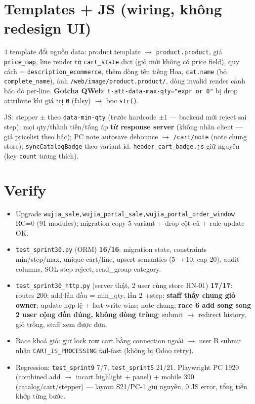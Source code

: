 \section{Templates + JS (wiring, không redesign UI)}

4 template đổi nguồn data: product.template $\rightarrow$ \texttt{product.product}, giá
\texttt{price\_map}, line render từ \texttt{cart\_state} dict (giỏ mới không có price field),
quy cách = \texttt{description\_ecommerce}, thêm dòng tên tiếng Hoa, \texttt{cat.name} (bỏ
\texttt{complete\_name}), ảnh \texttt{/web/image/product.product/}, dòng invalid render
cảnh báo đỏ per-line. \textbf{Gotcha QWeb}: \texttt{t-att-data-max-qty="expr or 0"} bị drop
attribute khi giá trị \texttt{0} (falsy) $\rightarrow$ bọc \texttt{str()}.

JS: stepper $\pm$ theo \texttt{data-min-qty} (trước hardcode $\pm1$ --- backend mới reject sai
step); mọi qty/thành tiền/tổng áp \textbf{từ response server} (không nhân client --- giá
pricelist theo bậc); PC note autosave debounce $\rightarrow$ \texttt{/cart/note} (note chung
store); \texttt{syncCatalogBadge} theo variant id. \texttt{header\_cart\_badge.js} giữ nguyên
(key \texttt{count} tương thích).

\section{Verify}

\begin{itemize}
\item Upgrade \texttt{wujia\_sale,wujia\_portal\_sale,wujia\_portal\_order\_window} RC=0
      (91 modules); migration copy 5 variant + drop cột cũ + rule update OK.
\item \texttt{test\_sprint30.py} (ORM) \textbf{16/16}: migration state, constraints
      min/step/max, unique cart/line, upsert semantics (5$\rightarrow$10, cap 20), audit columns,
      SOL step reject, read\_group category.
\item \texttt{test\_sprint30\_http.py} (server thật, 2 user cùng store HN-01) \textbf{17/17}:
      routes 200; add lần đầu = min\_qty, lần 2 +step; \textbf{staff thấy chung giỏ owner};
      update hợp lệ + last-write-wins; note chung; \textbf{race 6 add song song 2 user cộng
      dồn đúng, không dòng trùng}; submit $\rightarrow$ redirect history, giỏ trống, staff xem
      được đơn.
\item Race khoá giỏ: giữ lock row cart bằng connection ngoài $\rightarrow$ user B submit nhận
      \texttt{CART\_IS\_PROCESSING} fail-fast (không bị Odoo retry).
\item Regression: \texttt{test\_sprint9} 7/7, \texttt{test\_sprint5} 21/21. Playwright PC 1920
      (combined add $\rightarrow$ incart highlight + panel) + mobile 390 (catalog/cart/stepper)
      --- layout S21/PC-1 giữ nguyên, 0 JS error, tổng tiền khớp từng bước.
\end{itemize}


